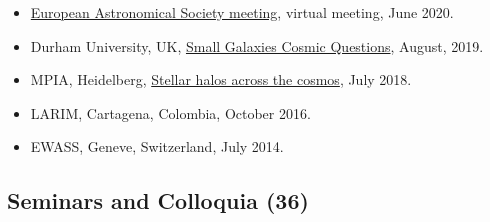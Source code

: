 \documentclass[14pt]{article}
\begin{document}
\begin{itemize}
\item \href{https://eas.unige.ch/EAS2020/}{European Astronomical Society meeting}, virtual meeting, June 2020.
\item Durham University, UK, \href{http://astro.dur.ac.uk/cosmodwarfs/}{Small Galaxies Cosmic Questions}, August, 2019.
\item MPIA, Heidelberg, \href{http://www.mpia.de/homes/stellarhalos2018-loc/sh2018/index.html}{Stellar halos across the cosmos}, July 2018.
\item LARIM, Cartagena, Colombia, October 2016.
\item EWASS, Geneve, Switzerland, July 2014.
\end{itemize}
  
\subsection*{Seminars and Colloquia (36)}
\end{document}
